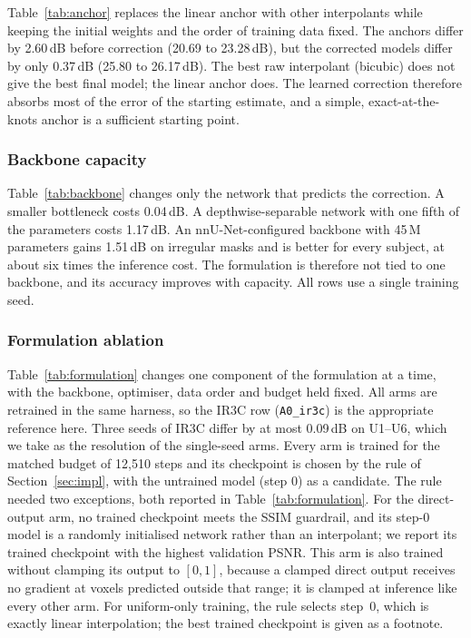 \documentclass[a4paper,fleqn]{cas-dc}
\begin{document}
Table~\ref{tab:anchor} replaces the linear anchor with other interpolants while keeping the
initial weights and the order of training data fixed. The anchors differ by 2.60\,dB before
correction (20.69 to 23.28\,dB), but the corrected models differ by only 0.37\,dB (25.80 to
26.17\,dB). The best raw interpolant (bicubic) does not give the best final model; the linear
anchor does. The learned correction therefore absorbs most of the error of the starting
estimate, and a simple, exact-at-the-knots anchor is a sufficient starting point.



\subsubsection{Backbone capacity}
\label{sec:backbone}

Table~\ref{tab:backbone} changes only the network that predicts the correction. A smaller
bottleneck costs 0.04\,dB. A depthwise-separable network with one fifth of the parameters
costs 1.17\,dB. An nnU-Net-configured backbone \citep{isensee2021nnunet} with 45\,M parameters
gains 1.51\,dB on irregular masks and is better for every subject, at about six times the
inference cost. The formulation is therefore not tied to one backbone, and its accuracy
improves with capacity. All rows use a single training seed.



\subsubsection{Formulation ablation}
\label{sec:pending-form}

Table~\ref{tab:formulation} changes one component of the formulation at a time, with the
backbone, optimiser, data order and budget held fixed. All arms are retrained in the same
harness, so the IR3C row (\texttt{A0\_ir3c}) is the appropriate reference here. Three seeds
of IR3C differ by at most 0.09\,dB on U1--U6, which we take as the resolution of the
single-seed arms. Every arm is trained for the matched budget of 12,510 steps and its
checkpoint is chosen by the rule of Section~\ref{sec:impl}, with the untrained model (step 0)
as a candidate. The rule needed two exceptions, both reported in Table~\ref{tab:formulation}.
For the direct-output arm, no trained checkpoint meets the SSIM guardrail, and its step-0
model is a randomly initialised network rather than an interpolant; we report its trained
checkpoint with the highest validation PSNR. This arm is also trained without clamping its
output to $[0,1]$, because a clamped direct output receives no gradient at voxels predicted
outside that range; it is clamped at inference like every other arm. For uniform-only training, the rule selects step~0,
which is exactly linear interpolation; the best trained checkpoint is given as a footnote.
\end{document}
